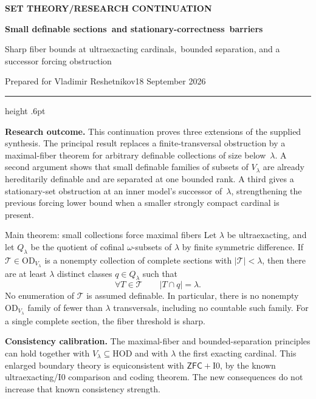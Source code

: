\documentclass[11pt,letterpaper]{article}
\theoremstyle{definition}
\numberwithin{equation}{section}
\newcommand{\ZFC}{\mathsf{ZFC}}
\newcommand{\HOD}{\mathrm{HOD}}
\newcommand{\OD}{\mathrm{OD}}
\newcommand{\Izero}{\mathrm{I0}}
\newcommand{\Tcal}{\mathcal T}
\begin{document}
\thispagestyle{empty}
{\sffamily\bfseries\small\color{Olive}SET THEORY\quad /\quad RESEARCH CONTINUATION}

\vspace{13pt}
{\fontsize{28}{31}\selectfont\bfseries\color{Forest}Small definable sections\ and stationary-correctness\ barriers\par}
\vspace{10pt}
{\fontsize{14}{18}\selectfont Sharp fiber bounds at ultraexacting cardinals,\ bounded separation, and a successor forcing obstruction\par}
\vspace{14pt}
{\color{Muted}Prepared for Vladimir Reshetnikov\hfill 18 September 2026\par}
\vspace{3pt}
{\color{Sage}\hrule height .6pt}
\vspace{12pt}

\textbf{Research outcome.} This continuation proves three extensions of the supplied synthesis. The principal result replaces a finite-transversal obstruction by a maximal-fiber theorem for arbitrary definable collections of size below~$\lambda$. A second argument shows that small definable families of subsets of $V_\lambda$ are already hereditarily definable and are separated at one bounded rank. A third gives a stationary-set obstruction at an inner model's successor of~$\lambda$, strengthening the previous forcing lower bound when a smaller strongly compact cardinal is present.

\begin{assessment}{Main theorem: small collections force maximal fibers}
Let $\lambda$ be ultraexacting, and let $Q_\lambda$ be the quotient of cofinal $\omega$-subsets of $\lambda$ by finite symmetric difference. If $\Tcal\in\OD_{V_\lambda}$ is a nonempty collection of complete sections with $|\Tcal|<\lambda$, then there are at least $\lambda$ distinct classes $q\in Q_\lambda$ such that
\[
\forall T\in\Tcal\qquad |T\cap q|=\lambda.
\]
No enumeration of $\Tcal$ is assumed definable. In particular, there is no nonempty $\OD_{V_\lambda}$ family of fewer than $\lambda$ transversals, including no countable such family. For a single complete section, the fiber threshold is sharp.
\end{assessment}

\textbf{Consistency calibration.} The maximal-fiber and bounded-separation principles can hold together with $V_\lambda\subseteq\HOD$ and with $\lambda$ the first exacting cardinal. This enlarged boundary theory is equiconsistent with $\ZFC+\Izero$, by the known ultraexacting/$\Izero$ comparison and coding theorem. The new consequences do not increase that known consistency strength.
\end{document}
